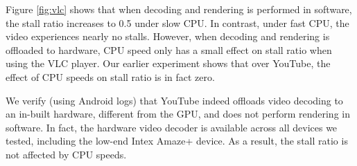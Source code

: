 Figure \ref{fig:vlc} shows that when decoding and rendering is performed in software, the stall ratio increases to 0.5 under slow CPU. In contrast, under fast CPU, the video experiences nearly no stalls. However, when decoding and rendering is offloaded to hardware, CPU speed only has a small effect on stall ratio when using the VLC player. Our earlier experiment shows that over YouTube, the effect of CPU speeds on stall ratio is in fact zero. 

We verify (using Android logs)  that YouTube indeed offloads video decoding to an in-built hardware, different from the GPU, and does not perform rendering in software. %
 In fact, the hardware video decoder is available across all devices we tested, including the low-end Intex Amaze+ device. As a result, the stall ratio is not affected by CPU speeds.


